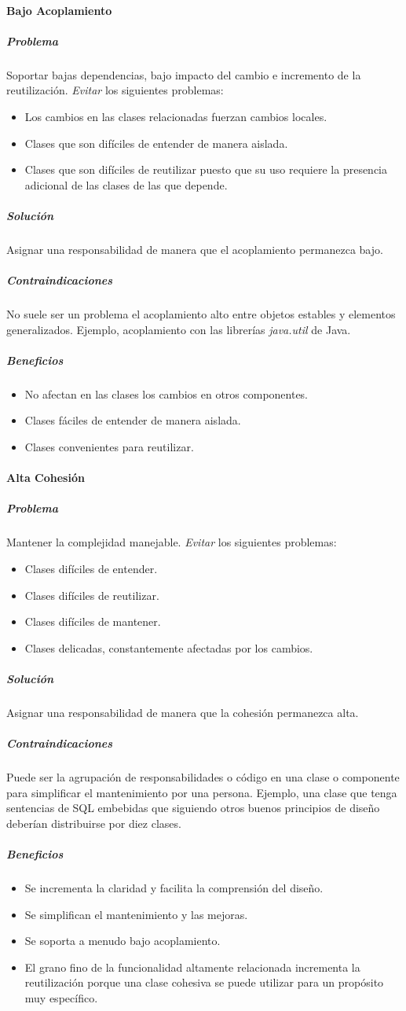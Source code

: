 \paragraph{Bajo Acoplamiento}
\subparagraph{Problema}
Soportar bajas dependencias, bajo impacto del cambio e incremento de la reutilización. \emph{Evitar} los siguientes problemas:
\begin{itemize}
\item Los cambios en las clases relacionadas fuerzan cambios locales.
\item Clases que son difíciles de entender de manera aislada.
\item Clases que son difíciles de reutilizar puesto que su uso requiere la presencia adicional de las clases de las que depende.
\end{itemize}
\subparagraph{Solución}
Asignar una responsabilidad de manera que el acoplamiento permanezca bajo.
\subparagraph{Contraindicaciones}
No suele ser un problema el acoplamiento alto entre objetos estables y elementos generalizados. Ejemplo, acoplamiento con las librerías \emph{java.util} de Java.
\subparagraph{Beneficios}
\begin{itemize}
\item No afectan en las clases los cambios en otros componentes.
\item Clases fáciles de entender de manera aislada.
\item Clases convenientes para reutilizar.
\end{itemize}
\paragraph{Alta Cohesión}
\subparagraph{Problema}
Mantener la complejidad manejable. \emph{Evitar} los siguientes problemas:
\begin{itemize}
\item Clases difíciles de entender.
\item Clases difíciles de reutilizar.
\item Clases difíciles de mantener.
\item Clases delicadas, constantemente afectadas por los cambios.
\end{itemize}
\subparagraph{Solución}
Asignar una responsabilidad de manera que la cohesión permanezca alta.
\subparagraph{Contraindicaciones}
Puede ser la agrupación de responsabilidades o código en una clase o componente para simplificar el mantenimiento por una persona. Ejemplo, una clase que tenga sentencias de SQL embebidas que siguiendo otros buenos principios de diseño deberían distribuirse por diez clases.
\subparagraph{Beneficios}
\begin{itemize}
\item Se incrementa la claridad y facilita la comprensión del diseño.
\item Se simplifican el mantenimiento y las mejoras.
\item Se soporta a menudo bajo acoplamiento.
\item El grano fino de la funcionalidad altamente relacionada incrementa la reutilización porque una clase cohesiva se puede utilizar para un propósito muy específico.
\end{itemize}

